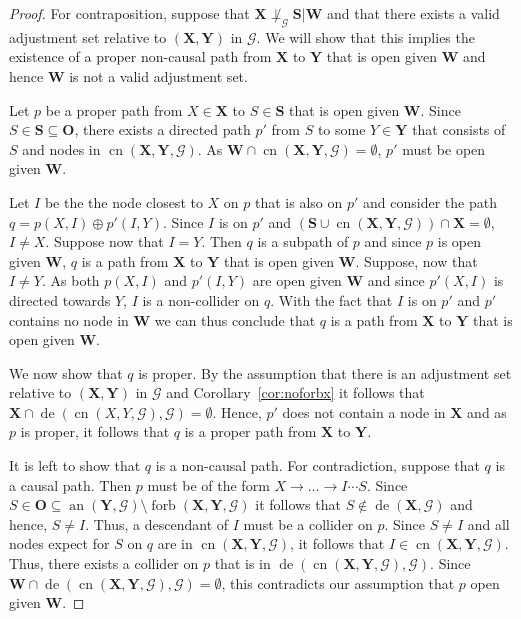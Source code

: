 \documentclass[11pt,a4paper]{article}
\theoremstyle{definition}
\theoremstyle{remark}
\DeclareMathOperator{\Forbb}{forb}
\DeclareMathOperator{\de}{de}
\DeclareMathOperator{\an}{an}
\DeclareMathOperator{\CN}{cn}
\newcommand{\g}[1][G]{\mathcal{#1}}
\newcommand{\fb}[2][X,Y]{\Forbb(\mathbf{#1},#2)}
\newcommand{\cn}[2][X,Y]{\CN(#1,#2)}
\newcommand{\cnb}[2][X,Y]{\CN(\mathbf{#1},#2)}
\begin{document}
\begin{proof}%
	For contraposition, suppose that $\mathbf{X} \not\perp_{\g}\mathbf{S}|\mathbf{W}$ and that there exists a valid adjustment set relative to $(\mathbf{X},\mathbf{Y})$ in $\g$. We will show that this implies the existence of a proper non-causal path from $\mathbf{X}$ to $\mathbf{Y}$ that is open given $\mathbf{W}$ and hence $\mathbf{W}$ is not a valid adjustment set. %
	
	Let $p$ be a proper path from $X \in \mathbf{X}$ to $S \in \mathbf{S}$ that is open given $\mathbf{W}$. Since $S \in \mathbf{S} \subseteq \mathbf{O}$, there exists a directed path $p'$ from $S$ to some $Y \in \mathbf{Y}$ that consists of $S$ and nodes in $\cnb{\g}$.
	As $\mathbf{W} \cap \cnb{\g} = \emptyset$, $p'$ must be open given $\mathbf{W}$. 
	
	Let $I$ be the the node closest to  $X$ on $p$ that is also on $p'$ and consider the path $q=p(X, I) \oplus p'(I, Y)$. Since $I$ is on $p'$ and $(\mathbf{S} \cup \cnb{\g}) \cap \mathbf{X}=\emptyset$, $I \neq X$. 
	Suppose now that $I=Y$. Then $q$ is a subpath of $p$ and since $p$ is open given $\mathbf{W}$, $q$ is a path from $\mathbf{X}$ to $\mathbf{Y}$ that is open given $\mathbf{W}$. Suppose, now that $I \neq Y$. As both $p(X,I)$ and $p'(I,Y)$ are open given $\mathbf{W}$ and since $p'(X,I)$ is directed towards $Y$, $I$ is a  non-collider on $q$. With the fact that $I$ is on $p'$ and $p'$ contains no node in $\mathbf{W}$ we can thus conclude that $q$ is a path from $\mathbf{X}$ to $\mathbf{Y}$ that is open given $\mathbf{W}$.
	
	We now show that $q$ is proper.
	By the assumption that there is an adjustment set relative to $(\mathbf{X,Y})$ in $\g$ and Corollary~\ref{cor:noforbx} it follows that $\mathbf{X} \cap \de(\cn{\g},\g) = \emptyset$. Hence, $p'$ does not contain a node in $\mathbf{X}$ and as $p$ is proper, it follows that $q$ is a proper path from $\mathbf{X}$ to $\mathbf{Y}$.
	
	It is left to show that $q$ is a non-causal path. For contradiction, suppose that $q$ is a causal path. Then $p$ must be of the form 
	$
	X \rightarrow \dots \rightarrow I \cdots S.
	$
	Since $S \in \mathbf{O} \subseteq \an(\mathbf{Y},\g) \setminus \fb{\g}$ it follows that $S \notin \de(\mathbf{X},\g)$ and hence, $S \neq I$. Thus, a descendant of $I$ must be a collider on $p$. Since $S \neq I$ and all nodes expect for $S$ on $q$ are in $\cnb{\g}$, it follows that $I \in \cnb{\g}$. Thus, there exists a collider on $p$ that is in $\de(\cnb{\g},\g)$. Since $\mathbf{W} \cap \de(\cnb{\g},\g) = \emptyset$, this contradicts our assumption that $p$ open given $\mathbf{W}$. 
\end{proof}
\end{document}
